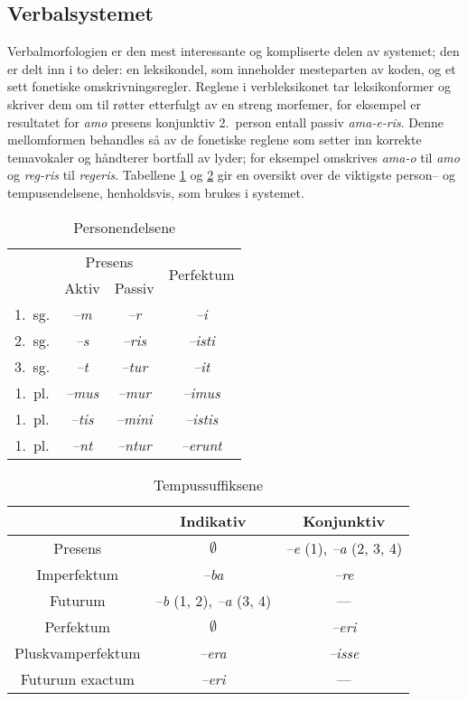 \documentclass{article}
\let\w\emph
\begin{document}
\subsection{Verbalsystemet}
\label{konjugasjon}
Verbalmorfologien er den mest interessante og kompliserte delen av systemet;
den er delt inn i to deler: en leksikondel, som inneholder mesteparten av
koden, og et sett fonetiske omskrivningsregler. Reglene i verbleksikonet tar
leksikonformer og skriver dem om til r\o{}tter etterfulgt av en streng
morfemer, for eksempel er resultatet for \w{amo} presens konjunktiv 2.~person
entall passiv \w{ama-e-ris}. Denne mellomformen behandles s\aa{} av de
fonetiske reglene som setter inn korrekte temavokaler og h\aa{}ndterer
bortfall av lyder; for eksempel omskrives \w{ama-o} til \w{amo} og \w{reg-ris}
til \w{regeris}. Tabellene \ref{endelser} og \ref{tempus} gir en oversikt over
de viktigste person-- og tempusendelsene, henholdsvis, som brukes i systemet.

\begin{table}
\begin{center}
\begin{tabular}{|c|c|c|c|}
    \hline
       & \multicolumn{2}{c|}{Presens} & \multirow{2}{*}{Perfektum} \\ \cline{2-3}
       & Aktiv & Passiv & \\
    \hline
1.~sg. & \w{--m}   & \w{--r}    & \w{--i}     \\
2.~sg. & \w{--s}   & \w{--ris}  & \w{--isti}  \\
3.~sg. & \w{--t}   & \w{--tur}  & \w{--it}    \\
1.~pl. & \w{--mus} & \w{--mur}  & \w{--imus}  \\
1.~pl. & \w{--tis} & \w{--mini} & \w{--istis} \\
1.~pl. & \w{--nt}  & \w{--ntur} & \w{--erunt} \\
    \hline
\end{tabular}
\caption{Personendelsene}
\label{endelser}
\end{center}
\end{table}

\begin{table}
\begin{center}
\begin{tabular}{|c|c|c|}
    \hline
                  & Indikativ   & Konjunktiv \\
    \hline
Presens           & $\emptyset$ & \w{--e} (1), \w{--a} (2, 3, 4) \\
Imperfektum       & \w{--ba} & \w{--re} \\
Futurum           & \w{--b} (1, 2), \w{--a} (3, 4) & --- \\
    \hline
Perfektum         & $\emptyset$ & \w{--eri} \\
Pluskvamperfektum & \w{--era} & \w{--isse} \\
Futurum exactum   & \w{--eri} & ---        \\
    \hline
\end{tabular}
\caption{Tempussuffiksene}
\label{tempus}
\end{center}
\end{table}
\end{document}
